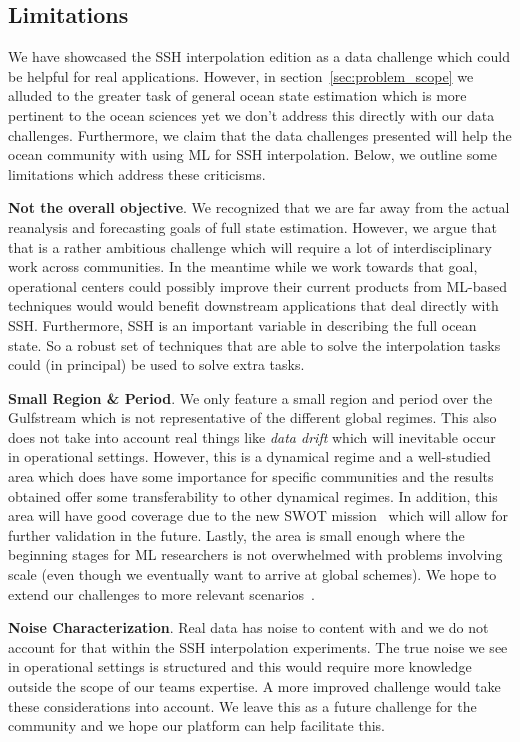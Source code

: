 \begin{bibunit}
\newpage
\subsection{Limitations}

We have showcased the SSH interpolation edition as a data challenge which could be helpful for real applications. 
However, in section~\ref{sec:problem_scope} we alluded to the greater task of general ocean state estimation which is more pertinent to the ocean sciences yet we don't address this directly with our data challenges.
Furthermore, we claim that the data challenges presented will help the ocean community with using ML for SSH interpolation.
Below, we outline some limitations which address these criticisms.

\textbf{Not the overall objective}. 
We recognized that we are far away from the actual reanalysis and forecasting goals of full state estimation. 
However, we argue that that is a rather ambitious challenge which will require a lot of interdisciplinary work across communities. 
In the meantime while we work towards that goal, operational centers could possibly improve their current products from ML-based techniques would would benefit downstream applications that deal directly with SSH.
Furthermore, SSH is an important variable in describing the full ocean state.
So a robust set of techniques that are able to solve the interpolation tasks could (in principal) be used to solve extra tasks.

\textbf{Small Region \& Period}.
We only feature a small region and period over the Gulfstream which is not representative of the different global regimes. 
This also does not take into account real things like \textit{data drift} which will inevitable occur in operational settings.
However, this is a dynamical regime and a well-studied area which does have some importance for specific communities and the results obtained offer some transferability to other dynamical regimes.
In addition, this area will have good coverage due to the new SWOT mission~\cite{SWOT} which will allow for further validation in the future.
Lastly, the area is small enough where the beginning stages for ML researchers is not overwhelmed with problems involving scale (even though we eventually want to arrive at global schemes).
We hope to extend our challenges to more relevant scenarios~\cite{MDSALONGTRACK}.


\textbf{Noise Characterization}.
Real data has noise to content with and we do not account for that within the SSH interpolation experiments.
The true noise we see in operational settings is structured and this would require more knowledge outside the scope of our teams expertise.
A more improved challenge would take these considerations into account.
We leave this as a future challenge for the community and we hope our platform can help facilitate this.


\end{bibunit}
